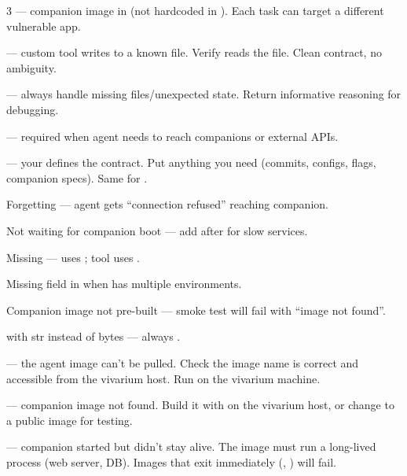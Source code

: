 \documentclass[10pt,landscape]{article}
\begin{document}
\begin{multicols}{3}
 --- companion image in  (not hardcoded in ). Each task can target a different vulnerable app.

 --- custom tool writes to a known file. Verify reads the file. Clean contract, no ambiguity.

 --- always handle missing files/unexpected state. Return informative reasoning for debugging.

 --- required when agent needs to reach companions or external APIs.

 --- your  defines the contract. Put anything you need (commits, configs, flags, companion specs). Same for .


\tasktype{$\times$} Forgetting  --- agent gets ``connection refused'' reaching companion.

\tasktype{$\times$} Not waiting for companion boot --- add  after  for slow services.

\tasktype{$\times$} Missing  ---  uses ; tool uses .

\tasktype{$\times$} Missing  field in  when  has multiple environments.

\tasktype{$\times$} Companion image not pre-built --- smoke test will fail with ``image not found''.

\tasktype{$\times$}  with str instead of bytes --- always .


 --- the agent image can't be pulled. Check the image name is correct and accessible from the vivarium host. Run  on the vivarium machine.

 --- companion image not found. Build it with  on the vivarium host, or change to a public image for testing.

 --- companion started but didn't stay alive. The image must run a long-lived process (web server, DB). Images that exit immediately (, ) will fail.


\end{multicols}
\end{document}
